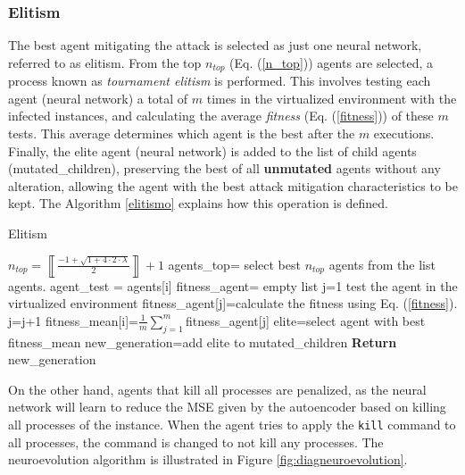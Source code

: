 \documentclass{iosart2c}
\begin{document}
\subsubsection{Elitism}

The best agent mitigating the attack is selected as just one neural network, referred to as elitism. From the top $n_{top}$ (Eq. (\ref{n_top})) agents are selected, a process known as \textit{tournament elitism} is performed. This involves testing each agent (neural network) a total of $m$ times in the virtualized environment with the infected instances, and calculating the average \textit{fitness} (Eq. (\ref{fitness})) of these $m$ tests. This average determines which agent is the best after the $m$ executions. Finally, the elite agent (neural network) is added to the list of child agents (mutated\_children), preserving the best of all \textbf{unmutated} agents without any alteration, allowing the agent with the best attack mitigation characteristics to be kept. The Algorithm \ref{elitismo} explains how this operation is defined.


\begin{algorithm}[h!]
\caption{Elitism}\label{elitismo}
\begin{algorithmic}[1]
\State $n_{top}=\left\llbracket\frac{-1+\sqrt{1+4\cdot2\cdot \lambda}}{2}\right\rrbracket+1$
\State agents\_top= select best $n_{top}$ agents from the list agents.
    \State agent\_test = agents[i]
    \State fitness\_agent= empty list
    \State j=1
    \Repeat
        \State test the agent in the virtualized environment
        \State fitness\_agent[j]=calculate the fitness using Eq. (\ref{fitness}).
        \State j=j+1
\EndFor
\State fitness\_mean[i]=$\frac{1}{m}\sum^m_{j=1}$fitness\_agent[j]
\State elite=select agent with best fitness\_mean
\State new\_generation=add elite to mutated\_children
\State \textbf{Return} new\_generation
\EndFunction
\end{algorithmic}
\end{algorithm}


On the other hand, agents that kill all processes are penalized, as the neural network will learn to reduce the MSE given by the autoencoder based on killing all processes of the instance. When the agent tries to apply the \texttt{kill} command to all processes, the command is changed to not kill any processes. The neuroevolution algorithm is illustrated in Figure \ref{fig:diagneuroevolution}.
\end{document}
